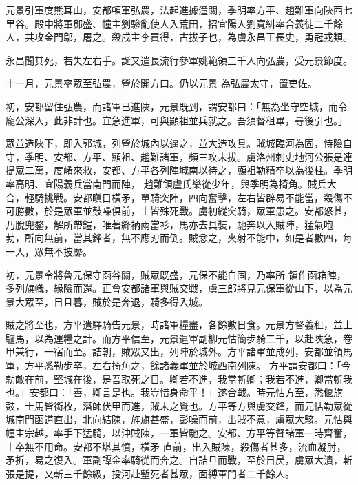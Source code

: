 \begin{pinyinscope}
 元景引軍度熊耳山，安都頓軍弘農，法起進據潼關，季明率方平、趙難軍向陜西七里谷。殿中將軍鄧盛、幢主劉驂亂使人入荒田，招宜陽人劉寬糾率合義徒二千餘人，共攻金門鄔，屠之。殺戍主李買得，古拔子也，為虜永昌王長史，勇冠戎類。



 永昌聞其死，若失左右手。誕又遣長流行參軍姚範領三千人向弘農，受元景節度。



 十一月，元景率眾至弘農，營於開方口。仍以元景
 為弘農太守，置吏佐。



 初，安都留住弘農，而諸軍已進陜，元景既到，謂安都曰：「無為坐守空城，而令龐公深入，此非計也。宜急進軍，可與顯祖並兵就之。吾須督租畢，尋後引也。」



 眾並造陜下，即入郭城，列營於城內以逼之，並大造攻具。賊城臨河為固，恃險自守，季明、安都、方平、顯祖、趙難諸軍，頻三攻未拔。虜洛州刺史地河公張是連提眾二萬，度崤來救，安都、方平各列陣城南以待之，顯祖勒精卒以為後柱。季明率高明、宜陽義兵當南門而陣，
 趙難領盧氏樂從少年，與季明為掎角。賊兵大合，輕騎挑戰。安都瞋目橫矛，單騎突陣，四向奮擊，左右皆辟易不能當，殺傷不可勝數，於是眾軍並鼓噪俱前，士皆殊死戰。虜初縱突騎，眾軍患之。安都怒甚，乃脫兜鍪，解所帶鎧，唯著絳衲兩當衫，馬亦去具裝，馳奔以入賊陣，猛氣咆勃，所向無前，當其鋒者，無不應刃而倒。賊忿之，夾射不能中，如是者數四，每一入，眾無不披靡。



 初，元景令將魯元保守函谷關，賊眾既盛，元保不能自固，乃率所
 領作函箱陣，多列旗幟，緣險而還。正會安都諸軍與賊交戰，虜三郎將見元保軍從山下，以為元景大眾至，日且暮，賊於是奔退，騎多得入城。



 賊之將至也，方平遣驛騎告元景，時諸軍糧盡，各餘數日食。元景方督義租，並上驢馬，以為運糧之計。而方平信至，元景遣軍副柳元怙簡步騎二千，以赴陜急，卷甲兼行，一宿而至。詰朝，賊眾又出，列陣於城外。方平諸軍並成列，安都並領馬軍，方平悉勒步卒，左右掎角之，餘諸義軍並於城西南列陳。
 方平謂安都曰：「今勍敵在前，堅城在後，是吾取死之日。卿若不進，我當斬卿；我若不進，卿當斬我也。」安都曰：「善，卿言是也。我豈惜身命乎！」遂合戰。時元怙方至，悉偃旗鼓，士馬皆銜枚，潛師伏甲而進，賊未之覺也。方平等方與虜交鋒，而元怙勒眾從城南門函道直出，北向結陳，旌旗甚盛，彭噪而前，出賊不意，虜眾大駭。元怙與幢主宗越，率手下猛騎，以沖賊陳，一軍皆馳之。安都、方平等督諸軍一時齊奮，士卒無不用命。安都不堪其憤，橫矛
 直前，出入賊陳，殺傷者甚多，流血凝肘，矛折，易之復入。軍副譚金率騎從而奔之。自詰旦而戰，至於日昃，虜眾大潰，斬張是提，又斬三千餘級，投河赴塹死者甚眾，面縛軍門者二千餘人。




\end{pinyinscope}
